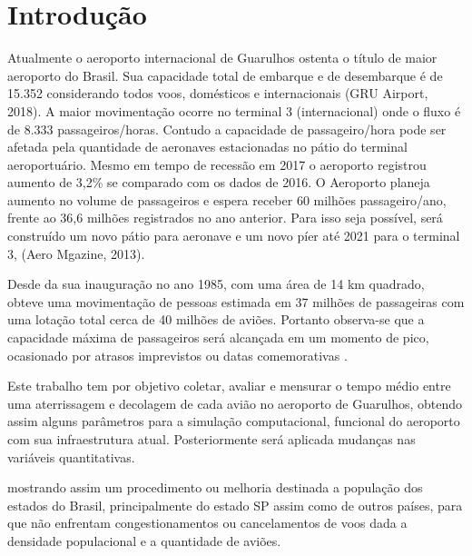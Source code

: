 \documentclass[12pt]{article}
\begin{document}
  
  \section{Introdução}
  
    Atualmente o aeroporto internacional de Guarulhos ostenta o título de maior
    aeroporto do Brasil. Sua capacidade total de embarque e de desembarque é
    de 15.352 considerando todos voos, domésticos e internacionais (GRU Airport, 2018).
    A maior movimentação ocorre no terminal 3 (internacional) onde o fluxo é de
    8.333 passageiros/horas. Contudo a capacidade de passageiro/hora pode ser 
    afetada pela quantidade de aeronaves estacionadas no pátio do terminal
    aeroportuário. Mesmo em tempo de recessão em 2017 o aeroporto registrou 
    aumento de 3,2\% se comparado com os dados de 2016. O Aeroporto planeja
    aumento no volume de passageiros e espera receber 60 milhões passageiro/ano,
    frente ao 36,6 milhões registrados no ano anterior. Para isso seja possível,
    será construído um novo pátio para aeronave e um novo píer até 2021 para o 
    terminal 3, (Aero Mgazine, 2013).
  
    Desde da sua inauguração no ano 1985, com uma área de 14 km quadrado,
    obteve uma movimentação de pessoas estimada em  37 milhões de passageiras
    com uma lotação total cerca de 40 milhões de aviões. Portanto observa-se
    que a capacidade máxima de passageiros será alcançada em um momento de
    pico, ocasionado por atrasos imprevistos ou datas comemorativas
    \cite{Moser:07}.
    
  
  
  
  Este trabalho tem por objetivo coletar, avaliar e mensurar o tempo médio
  entre uma aterrissagem e  decolagem de cada avião no aeroporto de Guarulhos,
  obtendo assim alguns parâmetros para a simulação computacional, funcional 
  do aeroporto com sua infraestrutura atual.
  Posteriormente será aplicada mudanças nas variáveis quantitativas.
  
  mostrando assim um procedimento ou melhoria destinada  a população dos
  estados do Brasil, principalmente do estado SP assim como de outros países,
  para que não enfrentam congestionamentos ou cancelamentos de voos dada a 
  densidade populacional e a quantidade de aviões.
  
\end{document}
